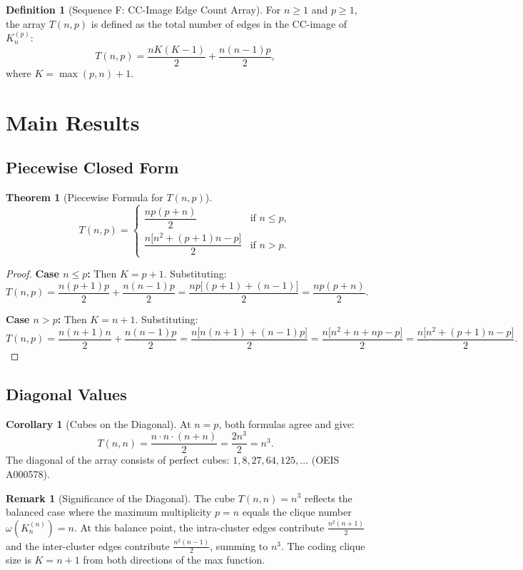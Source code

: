 \documentclass[11pt,a4paper]{article}
\theoremstyle{definition}
\newtheorem{definition}{Definition}[section]
\newtheorem{theorem}{Theorem}[section]
\newtheorem{corollary}{Corollary}[section]
\newtheorem{remark}{Remark}[section]
\begin{document}
\begin{definition}[Sequence F: CC-Image Edge Count Array]
For $n \geq 1$ and $p \geq 1$, the array $T(n, p)$ is defined as the total number of edges in the CC-image of $K_n^{(p)}$:
\[
T(n, p) = \frac{nK(K-1)}{2} + \frac{n(n-1)p}{2},
\]
where $K = \max(p, n) + 1$.
\end{definition}

\section{Main Results}

\subsection{Piecewise Closed Form}

\begin{theorem}[Piecewise Formula for $T(n, p)$]
\label{thm:piecewise}
\[
T(n, p) = \begin{cases}
\dfrac{np(p + n)}{2} & \text{if } n \leq p, \\[8pt]
\dfrac{n\bigl[n^2 + (p+1)n - p\bigr]}{2} & \text{if } n > p.
\end{cases}
\]
\end{theorem}

\begin{proof}
\textbf{Case $n \leq p$:} Then $K = p + 1$. Substituting:
\[
T(n, p) = \frac{n(p+1)p}{2} + \frac{n(n-1)p}{2} = \frac{np\bigl[(p+1) + (n-1)\bigr]}{2} = \frac{np(p+n)}{2}.
\]

\textbf{Case $n > p$:} Then $K = n + 1$. Substituting:
\[
T(n, p) = \frac{n(n+1)n}{2} + \frac{n(n-1)p}{2} = \frac{n\bigl[n(n+1) + (n-1)p\bigr]}{2} = \frac{n\bigl[n^2 + n + np - p\bigr]}{2} = \frac{n\bigl[n^2 + (p+1)n - p\bigr]}{2}.
\]
\end{proof}

\subsection{Diagonal Values}

\begin{corollary}[Cubes on the Diagonal]
At $n = p$, both formulas agree and give:
\[
T(n, n) = \frac{n \cdot n \cdot (n + n)}{2} = \frac{2n^3}{2} = n^3.
\]
The diagonal of the array consists of perfect cubes: $1, 8, 27, 64, 125, \ldots$ (OEIS A000578).
\end{corollary}

\begin{remark}[Significance of the Diagonal]
The cube $T(n, n) = n^3$ reflects the balanced case where the maximum multiplicity $p = n$ equals the clique number $\omega(K_n^{(n)}) = n$. At this balance point, the intra-cluster edges contribute $\frac{n^2(n+1)}{2}$ and the inter-cluster edges contribute $\frac{n^2(n-1)}{2}$, summing to $n^3$. The coding clique size is $K = n + 1$ from both directions of the max function.
\end{remark}
\end{document}
